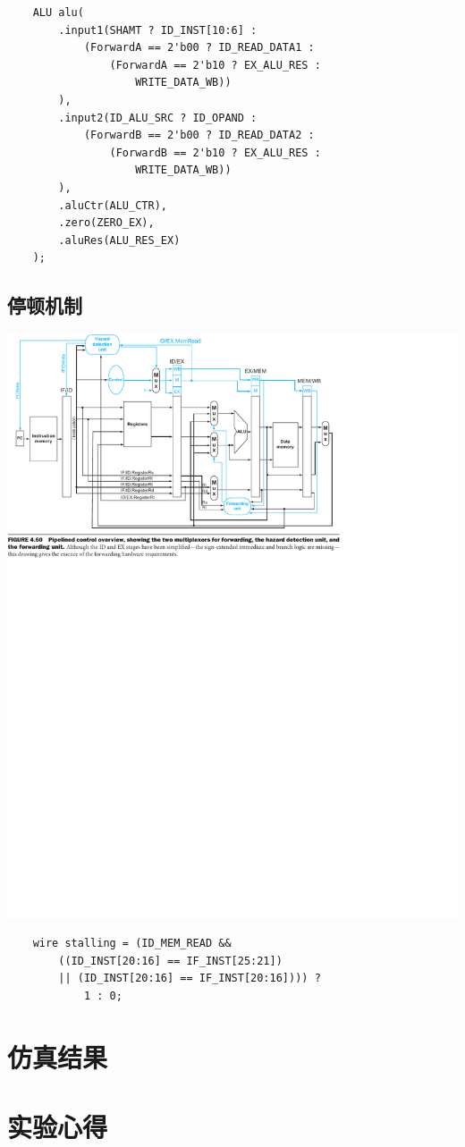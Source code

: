 \documentclass[a4paper,UTF8]{ctexart}
\begin{document}
\begin{verbatim}
    ALU alu(
        .input1(SHAMT ? ID_INST[10:6] : 
            (ForwardA == 2'b00 ? ID_READ_DATA1 :
                (ForwardA == 2'b10 ? EX_ALU_RES : 
                    WRITE_DATA_WB))
        ),
        .input2(ID_ALU_SRC ? ID_OPAND : 
            (ForwardB == 2'b00 ? ID_READ_DATA2 :
                (ForwardB == 2'b10 ? EX_ALU_RES :
                    WRITE_DATA_WB))
        ),
        .aluCtr(ALU_CTR),
        .zero(ZERO_EX),
        .aluRes(ALU_RES_EX)
    );
\end{verbatim}

\subsection{停顿机制}

\includegraphics[width=\textwidth]{stall.pdf}

\begin{verbatim}
    wire stalling = (ID_MEM_READ && 
        ((ID_INST[20:16] == IF_INST[25:21]) 
        || (ID_INST[20:16] == IF_INST[20:16]))) ? 
            1 : 0;
\end{verbatim}

\section{仿真结果}


\section{实验心得}
\end{document}
